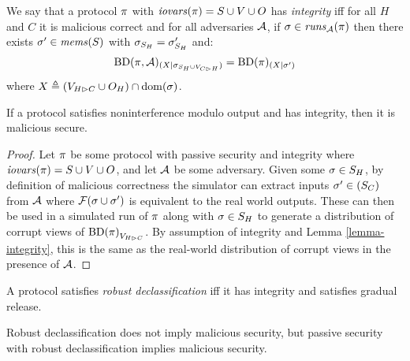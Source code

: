 \begin{definition}[Integrity]
  We say that a protocol $\pi$ with $\mathit{iovars}(\pi) = S \cup V \cup O$ has
  \emph{integrity} iff for all $H$ and $C$ 
  it is malicious correct and for all adversaries $\mathcal{A}$,
  if $\sigma \in \mathit{runs}_{\mathcal{A}}(\pi)$ 
  then there exists $\sigma' \in \mathit{mems}(S)$ with $\sigma_{S_H} = \sigma'_{S_H} $ and:
    $$
    \mathrm{BD}(\pi,\mathcal{A})_{({X}|{\sigma_{S_H \cup V_{C \rhd H}}})} =
    \mathrm{BD}(\pi)_{({X}|{\sigma'})}
    $$ 
  where $X \triangleq (V_{H \rhd C} \cup O_H) \cap \mathrm{dom}(\sigma)$. 
\end{definition}

\begin{theorem}
  If a protocol satisfies noninterference modulo output and has
  integrity, then it is malicious secure.
\end{theorem}

\begin{proof}
  Let $\pi$ be some protocol with passive security and integrity
  where $\mathit{iovars}(\pi) = S \cup V \cup O$, and let $\mathcal{A}$ be some
  adversary.  Given some $\sigma\in S_H$, by definition of malicious
  correctness the simulator can extract inputs $\sigma' \in (S_C)$
  from $\mathcal{A}$ where $\mathcal{F}(\sigma \cup \sigma')$ is equivalent
  to the real world outputs. These can then be used in a simulated run
  of $\pi$ along with $\sigma \in S_H$ to generate a distribution
  of corrupt views of ${\mathrm{BD}(\pi)}_{V_{H \rhd C}}$.
  By assumption of integrity and Lemma \ref{lemma-integrity},
  this is the same as the real-world distribution of corrupt views
  in the presence of $\mathcal{A}$. 
\end{proof}


\begin{definition}
  A protocol satisfies \emph{robust declassification} iff it has integrity and
  satisfies gradual release. 
\end{definition}

\begin{theorem}
  Robust declassification does not imply malicious security, but
  passive security with robust declassification implies malicious security.
\end{theorem}
